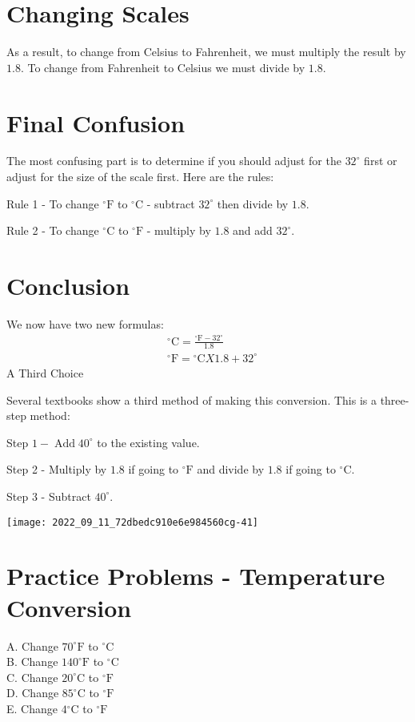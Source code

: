 \section{Changing Scales}
As a result, to change from Celsius to Fahrenheit, we must multiply the result by $1.8$. To change from Fahrenheit to Celsius we must divide by $1.8$.

\section{Final Confusion}
The most confusing part is to determine if you should adjust for the $32^{\circ}$ first or adjust for the size of the scale first. Here are the rules:

Rule 1 - To change ${ }^{\circ} \mathrm{F}$ to ${ }^{\circ} \mathrm{C}$ - subtract $32^{\circ}$ then divide by $1.8$.

Rule 2 - To change ${ }^{\circ} \mathrm{C}$ to ${ }^{\circ} \mathrm{F}$ - multiply by $1.8$ and add $32^{\circ}$.

\section{Conclusion}
We now have two new formulas:
$$
\begin{aligned}
&{ }^{\circ} \mathrm{C}=\frac{{ }^{\circ} \mathrm{F}-32^{\circ}}{1.8} \\
&{ }^{\circ} \mathrm{F}={ }^{\circ} \mathrm{C} X 1.8+32^{\circ}
\end{aligned}
$$
A Third Choice

Several textbooks show a third method of making this conversion. This is a three-step method:

Step $1-\operatorname{Add} 40^{\circ}$ to the existing value.

Step 2 - Multiply by $1.8$ if going to ${ }^{\circ} \mathrm{F}$ and divide by $1.8$ if going to ${ }^{\circ} \mathrm{C}$.

Step 3 - Subtract $40^{\circ}$.

\texttt{[image: 2022\_09\_11\_72dbedc910e6e984560cg-41]}

\section{Practice Problems - Temperature Conversion}
A. Change $70^{\circ} \mathrm{F}$ to ${ }^{\circ} \mathrm{C}$\\
B. Change $140^{\circ} \mathrm{F}$ to ${ }^{\circ} \mathrm{C}$\\
C. Change $20^{\circ} \mathrm{C}$ to ${ }^{\circ} \mathrm{F}$\\
D. Change $85^{\circ} \mathrm{C}$ to ${ }^{\circ} \mathrm{F}$\\
E. Change $4{ }^{\circ} \mathrm{C}$ to ${ }^{\circ} \mathrm{F}$

